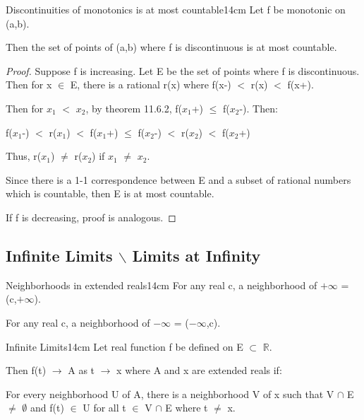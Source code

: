     \begin{wtheorem}{Discontinuities of monotonics is at most countable}{14cm}
        Let f be monotonic on (a,b).

        Then the set of points of (a,b) where f is discontinuous is
        at most countable.
    \end{wtheorem}

    \begin{proof}
        Suppose f is increasing.
        Let E be the set of points where f is discontinuous.
        Then for x $\in$ E, there is a rational r(x) where
        f(x-) $<$ r(x) $<$ f(x+).
        
        Then for $x_1$ $<$ $x_2$, by {\color{red} theorem 11.6.2},
        f($x_1$+) $\leq$ f($x_2$-). Then:

        \hspace{1cm}
        f($x_1$-) $<$ r($x_1$) $<$ f($x_1$+)
        $\leq$ f($x_2$-) $<$ r($x_2$) $<$ f($x_2$+)

        Thus, r($x_1$) $\not =$ r($x_2$) if $x_1$ $\not =$ $x_2$.

        Since there is a 1-1 correspondence between E and a subset
        of rational numbers which is countable, then E is at most countable.

        If f is decreasing, proof is analogous.
    \end{proof}

    \vspace{0.5cm}





\subsection{ Infinite Limits $\backslash$ Limits at Infinity }

    \begin{definition}{Neighborhoods in extended reals}{14cm}
        For any real c, a neighborhood of $+\infty$ = (c,$+\infty$).

        For any real c, a neighborhood of $-\infty$ = ($-\infty$,c).        
    \end{definition}

    \vspace{0.5cm}



    \begin{definition}{Infinite Limits}{14cm}
        Let real function f be defined on E $\subset$ $\mathbb{R}$.

        Then f(t) $\rightarrow$ A as t $\rightarrow$ x where A and x
        are extended reals if:
        
        \begin{adjustbox}{minipage=13cm, right, vspace=0.1cm 0cm}
            For every neighborhood U of A,
            there is a neighborhood V of x such that V $\cap$ E $\not =$ $\emptyset$
            and f(t) $\in$ U for all t $\in$ V $\cap$ E where t $\not =$ x.
        \end{adjustbox}        
    \end{definition}

